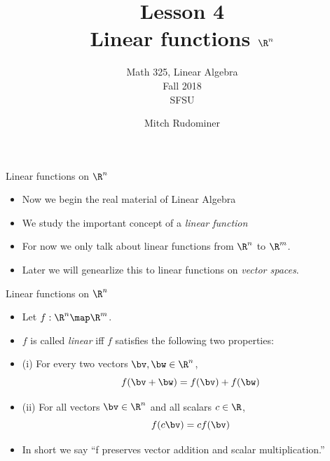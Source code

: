 \documentclass{beamer}
\title{Lesson 4 \\ Linear functions $\R^n$}
\subtitle{Math 325, Linear Algebra \\ Fall 2018 \\ SFSU}
\author{Mitch Rudominer}
\date{}
\begin{document}
\begin{frame}
  \titlepage
\end{frame}

\begin{frame}{Linear functions on $\R^n$}

\begin{itemize}
\item Now we begin the real material of Linear Algebra
\item We study the important concept of a \emph{linear function}
\item For now we only talk about linear functions from $\R^n$ to $\R^m$.
\item Later we will genearlize this to linear functions on \emph{vector spaces}.
\end{itemize}

\end{frame}

\begin{frame}{Linear functions on $\R^n$}

\begin{itemize}
\item Let $f:\R^n \map \R^m$.
\item $f$ is called \emph{linear} iff $f$ satisfies the following two properties:
\item (i) For every two vectors $\bv, \bw \in\R^n$, $$f(\bv + \bw) = f(\bv) + f(\bw)$$
\item (ii) For all vectors $\bv\in\R^n$ and all scalars $c\in \R$,
$$f(c \bv) = c f(\bv)$$
\item In short we say ``f preserves vector addition and scalar multiplication.''
\end{itemize}

\end{frame}
\end{document}
